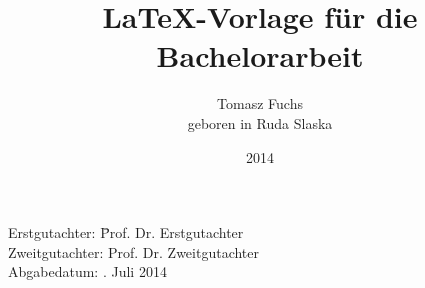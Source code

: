 







\newcommand{\thetitle}{\LaTeX-Vorlage für die Bachelorarbeit}
\newcommand{\Jahr}{2014}
\newcommand{\Geburtsort}{Castrop-Rauxel}
\newcommand{\Lehrstuhl}{Experimentelle Physik V}
\newcommand{\Betreuer}{Prof. Dr. Erstgutachter}
\newcommand{\Zweitgutachter}{Prof. Dr. Zweitgutachter}
\newcommand{\Abgabedatum}{11. Juli 2014}

\author{
    Tomasz Fuchs\\
    geboren in Ruda Slaska
}

\titlehead{
    \texttt{[image: logos/tu-logo.pdf]}
}
\title{\thetitle}
\date{\Jahr}

\subject{Arbeit zur Erlangung des akademischen Grades eines Doktors der Naturwissenschaften(Dr. rer. nat.)}
\publishers{Lehrstuhl für \Lehrstuhl \\ Fakultät Physik \\ Technische Universität Dortmund}




\frontmatter
\maketitle
\thispagestyle{empty}
\vspace*{\fill}
\begin{tabbing}
    Erstgutachter: \hspace{3em}\=   \Betreuer \\ 
    Zweitgutachter: \> \Zweitgutachter\\
    Abgabedatum: \>\Abgabedatum
\end{tabbing}
\newpage

